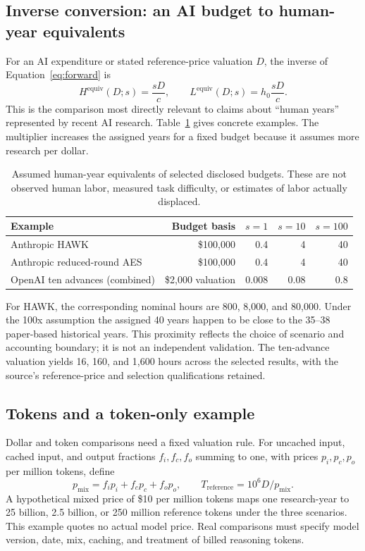 \documentclass[11pt,letterpaper]{article}
\begin{document}
\subsection{Inverse conversion: an AI budget to human-year equivalents}
For an AI expenditure or stated reference-price valuation $D$, the inverse of Equation~\eqref{eq:forward} is
\begin{equation}
 H^{\mathrm{equiv}}(D;s)=\frac{sD}{c},\qquad
 L^{\mathrm{equiv}}(D;s)=h_0\frac{sD}{c}.
 \label{eq:inverse}
\end{equation}
This is the comparison most directly relevant to claims about ``human years'' represented by recent AI research. Table~\ref{tab:inverse} gives concrete examples. The multiplier increases the assigned years for a fixed budget because it assumes more research per dollar.

\begin{table}[htbp]
\centering\small
\caption{Assumed human-year equivalents of selected disclosed budgets. These are not observed human labor, measured task difficulty, or estimates of labor actually displaced.}
\label{tab:inverse}
\begin{tabular}{lrrrr}\toprule
Example & Budget basis & $s=1$ & $s=10$ & $s=100$\\\midrule
Anthropic HAWK & \$100,000 & 0.4 & 4 & 40\\
Anthropic reduced-round AES & \$100,000 & 0.4 & 4 & 40\\
OpenAI ten advances (combined) & \$2,000 valuation & 0.008 & 0.08 & 0.8\\\bottomrule
\end{tabular}
\end{table}

For HAWK, the corresponding nominal hours are 800, 8,000, and 80,000. Under the 100x assumption the assigned 40 years happen to be close to the 35--38 paper-based historical years. This proximity reflects the choice of scenario and accounting boundary; it is not an independent validation. The ten-advance valuation yields 16, 160, and 1,600 hours across the selected results, with the source's reference-price and selection qualifications retained.

\subsection{Tokens and a token-only example}
Dollar and token comparisons need a fixed valuation rule. For uncached input, cached input, and output fractions $f_i,f_c,f_o$ summing to one, with prices $p_i,p_c,p_o$ per million tokens, define
\begin{equation}
 p_{\mathrm{mix}}=f_i p_i+f_c p_c+f_o p_o,\qquad
 T_{\mathrm{reference}}=10^6D/p_{\mathrm{mix}}.
\end{equation}
A hypothetical mixed price of \$10 per million tokens maps one research-year to 25 billion, 2.5 billion, or 250 million reference tokens under the three scenarios. This example quotes no actual model price. Real comparisons must specify model version, date, mix, caching, and treatment of billed reasoning tokens.
\end{document}
